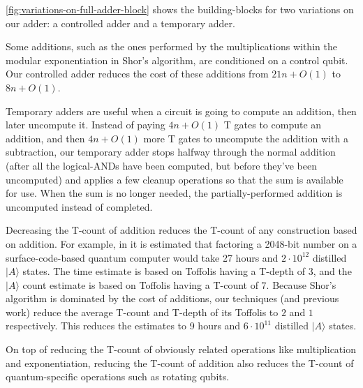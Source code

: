 \documentclass[twocolumn]{revtex4-1}
\begin{document}
\autoref{fig:variations-on-full-adder-block} shows the building-blocks for two variations on our adder: a controlled adder and a temporary adder.

Some additions, such as the ones performed by the multiplications within the modular exponentiation in Shor's algorithm, are conditioned on a control qubit.
Our controlled adder reduces the cost of these additions from $21n + O(1)$ \citep{Coreas2017} to $8n + O(1)$.

Temporary adders are useful when a circuit is going to compute an addition, then later uncompute it.
Instead of paying $4n + O(1)$ T gates to compute an addition, and then $4n + O(1)$ more T gates to uncompute the addition with a subtraction, our temporary adder stops halfway through the normal addition (after all the logical-ANDs have been computed, but before they've been uncomputed) and applies a few cleanup operations so that the sum is available for use.
When the sum is no longer needed, the partially-performed addition is uncomputed instead of completed.

Decreasing the T-count of addition reduces the T-count of any construction based on addition.
For example, in \citep{Fowler2012} it is estimated that factoring a 2048-bit number on a surface-code-based quantum computer would take 27 hours and $2 \cdot 10^{12}$ distilled $|A\rangle$ states.
The time estimate is based on Toffolis having a T-depth of 3, and the $|A\rangle$ count estimate is based on Toffolis having a T-count of 7.
Because Shor's algorithm is dominated by the cost of additions, our techniques (and previous work) reduce the average T-count and T-depth of its Toffolis to $2$ and $1$ respectively.
This reduces the estimates to 9 hours and $6 \cdot 10^{11}$ distilled $|A\rangle$ states.

On top of reducing the T-count of obviously related operations like multiplication and exponentiation, reducing the T-count of addition also reduces the T-count of quantum-specific operations such as rotating qubits.
\end{document}
